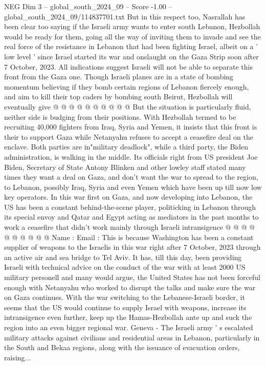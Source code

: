 \begin{textsample}{NEG Dim 3 – global\_south\_2024\_09 – Score -1.00 – global\_south\_2024\_09/114837701.txt}
But in this respect too, Nasrallah has been clear too saying if the Israeli army wants to enter south Lebanon, Hezbollah would be ready for them, going all the way of inviting them to invade and see the real force of the resistance in Lebanon that had been fighting Israel, albeit on a ' low level ' since Israel started its war and onslaught on the Gaza Strip soon after 7 October, 2023.
All indications suggest Israeli will not be able to separate this front from the Gaza one.
Though Israeli planes are in a state of bombing momentum believing if they bomb certain regions of Lebanon fiercely enough, and aim to kill their top caders by bombing south Beirut, Hezbollah will eventually give @ @ @ @ @ @ @ @ @ @ But the situation is particularly fluid, neither side is budging from their positions.
With Hezbollah termed to be recruiting 40,000 fighters from Iraq, Syria and Yemen, it insists that this front is their to support Gaza while Netanyahu refuses to accept a ceasefire deal on the enclave.
Both parties are in"military deadlock", while a third party, the Biden administration, is walking in the middle.
Its officials right from US president Joe Biden, Secretary of State Antony Blinken and other lowley staff stated many times they want a deal on Gaza, and don't want the war to spread to the region, to Lebanon, possibly Iraq, Syria and even Yemen which have been up till now low key operators.
In this war first on Gaza, and now developing into Lebanon, the US has been a constant behind-the-scene player, politicking in Lebanon through its special envoy and Qatar and Egypt acting as mediators in the past months to work a ceasefire that didn't work mainly through Israeli intransigence @ @ @ @ @ @ @ @ @ @ Name : Email : This is because Washington has been a constant supplier of weapons to the Israelis in this war right after 7 October, 2023 through an active air and sea bridge to Tel Aviv.
It has, till this day, been providing Israeli with technical advice on the conduct of the war with at least 2000 US military personell and many would argue, the United States has not been forceful enough with Netanyahu who worked to disrupt the talks and make sure the war on Gaza continues.
With the war switching to the Lebanese-Israeli border, it seems that the US would continue to supply Israel with weapons, increase its intransigence even further, keep up the Hamas-Hezbollah ante up and suck the region into an even bigger regional war.
Geneva - The Israeli army ' s escalated military attacks against civilians and residential areas in Lebanon, particularly in the South and Bekaa regions, along with the issuance of evacuation orders, raising...

\end{textsample}
